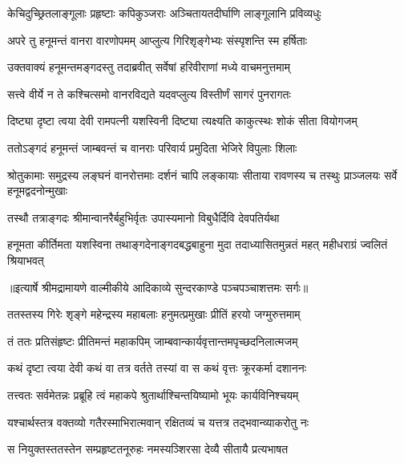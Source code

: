 \twolineshloka
{केचिदुच्छ्रितलाङ्गूलाः प्रहृष्टाः कपिकुञ्जराः}
{अञ्चितायतदीर्घाणि लाङ्गूलानि प्रविव्यधुः} %

\twolineshloka
{अपरे तु हनूमन्तं वानरा वारणोपमम्}
{आप्लुत्य गिरिशृङ्गेभ्यः संस्पृशन्ति स्म हर्षिताः} %

\twolineshloka
{उक्तवाक्यं हनूमन्तमङ्गदस्तु तदाब्रवीत्}
{सर्वेषां हरिवीराणां मध्ये वाचमनुत्तमाम्} %

\twolineshloka
{सत्त्वे वीर्ये न ते कश्चित्समो वानरविद्यते}
{यदवप्लुत्य विस्तीर्णं सागरं पुनरागतः} %

\twolineshloka
{दिष्ट्या दृष्टा त्वया देवी रामपत्नी यशस्विनी}
{दिष्ट्या त्यक्ष्यति काकुत्स्थः शोकं सीता वियोगजम्} %

\twolineshloka
{ततोऽङ्गदं हनूमन्तं जाम्बवन्तं च वानराः}
{परिवार्य प्रमुदिता भेजिरे विपुलाः शिलाः} %

\threelineshloka
{श्रोतुकामाः समुद्रस्य लङ्घनं वानरोत्तमाः}
{दर्शनं चापि लङ्कायाः सीताया रावणस्य च}
{तस्थुः प्राञ्जलयः सर्वे हनूमद्वदनोन्मुखाः} %

\twolineshloka
{तस्थौ तत्राङ्गदः श्रीमान्वानरैर्बहुभिर्वृतः}
{उपास्यमानो विबुधैर्दिवि देवपतिर्यथा} %

\fourlineindentedshloka
{हनूमता कीर्तिमता यशस्विना}
{तथाङ्गदेनाङ्गदबद्धबाहुना}
{मुदा तदाध्यासितमुन्नतं महत्}
{महीधराग्रं ज्वलितं श्रियाभवत्} %


{॥इत्यार्षे श्रीमद्रामायणे वाल्मीकीये आदिकाव्ये सुन्दरकाण्डे पञ्चपञ्चाशत्तमः सर्गः॥}


\twolineshloka
{ततस्तस्य गिरेः शृङ्गे महेन्द्रस्य महाबलाः}
{हनुमत्प्रमुखाः प्रीतिं हरयो जग्मुरुत्तमाम्} %

\twolineshloka
{तं ततः प्रतिसंहृष्टः प्रीतिमन्तं महाकपिम्}
{जाम्बवान्कार्यवृत्तान्तमपृच्छदनिलात्मजम्} %

\twolineshloka
{कथं दृष्टा त्वया देवी कथं वा तत्र वर्तते}
{तस्यां वा स कथं वृत्तः क्रूरकर्मा दशाननः} %

\twolineshloka
{तत्त्वतः सर्वमेतन्नः प्रब्रूहि त्वं महाकपे}
{श्रुतार्थाश्चिन्तयिष्यामो भूयः कार्यविनिश्चयम्} %

\twolineshloka
{यश्चार्थस्तत्र वक्तव्यो गतैरस्माभिरात्मवान्}
{रक्षितव्यं च यत्तत्र तद्भवान्व्याकरोतु नः} %

\twolineshloka
{स नियुक्तस्ततस्तेन सम्प्रहृष्टतनूरुहः}
{नमस्यञ्शिरसा देव्यै सीतायै प्रत्यभाषत} %


